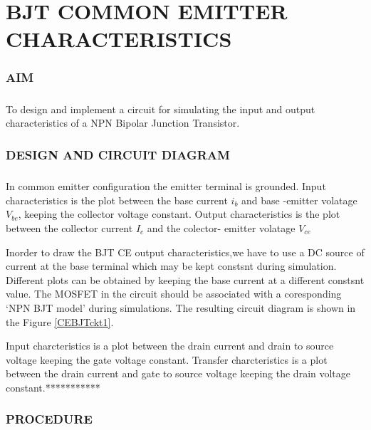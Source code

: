 \chapter{BJT COMMON EMITTER CHARACTERISTICS}

\subsection*{AIM}
\paragraph{}To design and implement a circuit for simulating the input and output characteristics of a NPN Bipolar Junction Transistor.

\subsection*{DESIGN AND CIRCUIT DIAGRAM}
\paragraph{}

In common emitter configuration the emitter terminal is grounded. Input characteristics is the plot between the base current $i_b$ and base -emitter volatage $V_{be}$, keeping the collector voltage constant.  Output characteristics is the plot between the collector current $I_c$ and the colector- emitter volatage $V_{ce}$

Inorder to draw the BJT CE output characteristics,we have to use a DC source of current at the base terminal which may be kept constsnt during simulation. Different plots can be obtained by keeping the base current at a different constsnt value. The MOSFET in the circuit should be associated with a coresponding `NPN BJT model' during  simulations. The resulting circuit diagram is shown in the Figure \ref{CEBJTckt1}.



Input charcteristics is a plot between the drain current and drain to source voltage keeping the gate voltage constant. Transfer charcteristics is a plot between the drain current and gate to source voltage keeping the drain voltage constant.***********

\subsection*{PROCEDURE}

